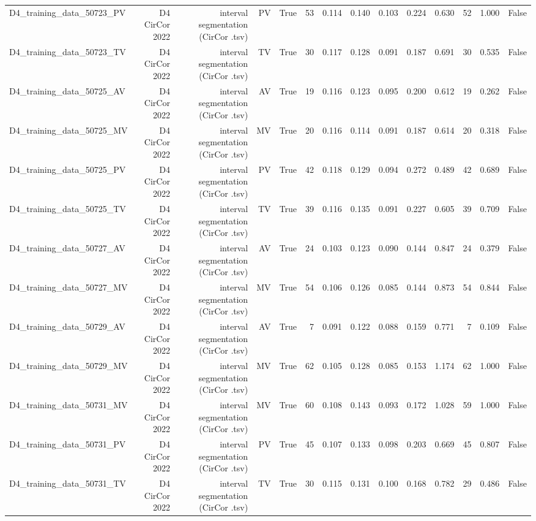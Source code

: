 \begin{table}[htbp]
\begin{tabular}{lrrrrrrrrrrrrr}
    D4\_training\_data\_50723\_PV & D4 CirCor 2022 & interval segmentation (CirCor .tsv) & PV & True & 53 & 0.114 & 0.140 & 0.103 & 0.224 & 0.630 & 52 & 1.000 & False \\
    D4\_training\_data\_50723\_TV & D4 CirCor 2022 & interval segmentation (CirCor .tsv) & TV & True & 30 & 0.117 & 0.128 & 0.091 & 0.187 & 0.691 & 30 & 0.535 & False \\
    D4\_training\_data\_50725\_AV & D4 CirCor 2022 & interval segmentation (CirCor .tsv) & AV & True & 19 & 0.116 & 0.123 & 0.095 & 0.200 & 0.612 & 19 & 0.262 & False \\
    D4\_training\_data\_50725\_MV & D4 CirCor 2022 & interval segmentation (CirCor .tsv) & MV & True & 20 & 0.116 & 0.114 & 0.091 & 0.187 & 0.614 & 20 & 0.318 & False \\
    D4\_training\_data\_50725\_PV & D4 CirCor 2022 & interval segmentation (CirCor .tsv) & PV & True & 42 & 0.118 & 0.129 & 0.094 & 0.272 & 0.489 & 42 & 0.689 & False \\
    D4\_training\_data\_50725\_TV & D4 CirCor 2022 & interval segmentation (CirCor .tsv) & TV & True & 39 & 0.116 & 0.135 & 0.091 & 0.227 & 0.605 & 39 & 0.709 & False \\
    D4\_training\_data\_50727\_AV & D4 CirCor 2022 & interval segmentation (CirCor .tsv) & AV & True & 24 & 0.103 & 0.123 & 0.090 & 0.144 & 0.847 & 24 & 0.379 & False \\
    D4\_training\_data\_50727\_MV & D4 CirCor 2022 & interval segmentation (CirCor .tsv) & MV & True & 54 & 0.106 & 0.126 & 0.085 & 0.144 & 0.873 & 54 & 0.844 & False \\
    D4\_training\_data\_50729\_AV & D4 CirCor 2022 & interval segmentation (CirCor .tsv) & AV & True & 7 & 0.091 & 0.122 & 0.088 & 0.159 & 0.771 & 7 & 0.109 & False \\
    D4\_training\_data\_50729\_MV & D4 CirCor 2022 & interval segmentation (CirCor .tsv) & MV & True & 62 & 0.105 & 0.128 & 0.085 & 0.153 & 1.174 & 62 & 1.000 & False \\
    D4\_training\_data\_50731\_MV & D4 CirCor 2022 & interval segmentation (CirCor .tsv) & MV & True & 60 & 0.108 & 0.143 & 0.093 & 0.172 & 1.028 & 59 & 1.000 & False \\
    D4\_training\_data\_50731\_PV & D4 CirCor 2022 & interval segmentation (CirCor .tsv) & PV & True & 45 & 0.107 & 0.133 & 0.098 & 0.203 & 0.669 & 45 & 0.807 & False \\
    D4\_training\_data\_50731\_TV & D4 CirCor 2022 & interval segmentation (CirCor .tsv) & TV & True & 30 & 0.115 & 0.131 & 0.100 & 0.168 & 0.782 & 29 & 0.486 & False \\

\end{tabular}
\end{table}

